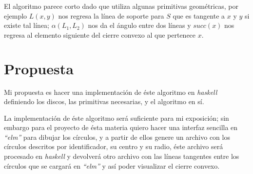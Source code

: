 \documentclass[12pt]{article}
\begin{document}
El algoritmo parece corto dado que utiliza algunas primitivas geométricas, por ejemplo $L(x,y)$ nos regresa la línea de soporte para $S$ que es tangente a $x$ y $y$ si existe tal línea; $\alpha(L_1,L_2)$ nos da el ángulo entre dos líneas y $succ(x)$ nos regresa al elemento siguiente del cierre convexo al que pertenece $x$.

\section*{Propuesta}

Mi propuesta es hacer una implementación de éste algoritmo en \textit{haskell} definiendo los discos, las primitivas necesarias, y el algoritmo en sí.

La implementación de éste algoritmo será suficiente para mi exposición; sin embargo para el proyecto de ésta materia quiero hacer una interfaz sencilla en \textit{``elm''} para dibujar los círculos, y a partir de ellos genere un archivo con los círculos descritos por identificador, su centro y su radio, éste archivo será procesado en \textit{haskell} y devolverá otro archivo con las líneas tangentes entre los círculos que se cargará en \textit{``elm''} y así poder visualizar el cierre convexo.
\end{document}
